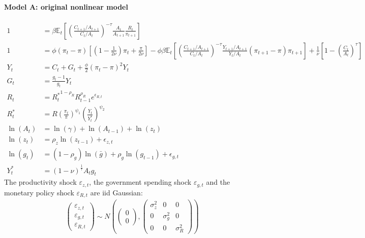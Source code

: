 \paragraph{Model A: original nonlinear model}
\begin{align}
1 &= \beta \mathbb{E}_t\left[\left(\frac{C_{t+1}/A_{t+1}}{C_t/A_t}\right)^{-\tau} \frac{A_t}{A_{t+1}} \frac{R_t}{\pi_{t+1}}\right]
\\
1 &= \phi \left(\pi_t - \pi\right) \left[\left(1-\frac{1}{2\nu}\right)\pi_t + \frac{\pi}{2\nu}\right] - \phi \beta \mathbb{E}_t \left[\left(\frac{C_{t+1}/A_{t+1}}{C_t/A_t}\right)^{-\tau} \frac{Y_{t+1}/A_{t+1}}{Y_t/A_t} \left(\pi_{t+1} - \pi \right) \pi_{t+1}\right] + \frac{1}{\nu}\left[1-\left({\frac{C_t}{A_t}}\right)^{\tau}\right]
\\
Y_t &= C_t + G_t + \frac{\phi}{2} \left({\pi_t - \pi}\right)^2 Y_t
\\
G_t &= \frac{g_t-1}{g_t} Y_t
\\
R_t &= {R_t^{*}}^{1-\rho_R} R_{t-1}^{\rho_R} e^{\epsilon_{R,t}}
\\
R_t^* & = R \left(\frac{\pi_t}{\bar{\pi}}\right)^{\psi_1} \left(\frac{Y_t}{Y_t^*}\right)^{\psi_2}
\\
\ln(A_t) &= \ln(\gamma) + \ln(A_{t-1}) + \ln(z_t)
\\
\ln(z_t) &= \rho_z \ln(z_{t-1}) + \epsilon_{z,t}
\\
\ln(g_t) &= (1-\rho_g)\ln(\bar{g}) + \rho_g \ln(g_{t-1}) + \epsilon_{g,t}
\\
Y_t^* &= (1-\nu)^{\frac{1}{\tau}} A_t g_t
\end{align}
The productivity shock $\varepsilon_{z,t}$, the government spending shock $\varepsilon_{g,t}$ and the monetary policy shock $\varepsilon_{R,t}$ are iid Gaussian:
\begin{align*}
\begin{pmatrix}
\varepsilon_{z,t}\\\varepsilon_{g,t}\\\varepsilon_{R,t}
\end{pmatrix}
\sim N\left(\begin{pmatrix} 0\\0\end{pmatrix}, \begin{pmatrix} \sigma_z^2 & 0 & 0\\0 & \sigma_{g}^2 &0 \\ 0 & 0 & \sigma_R^2\end{pmatrix}\right)
\end{align*}

